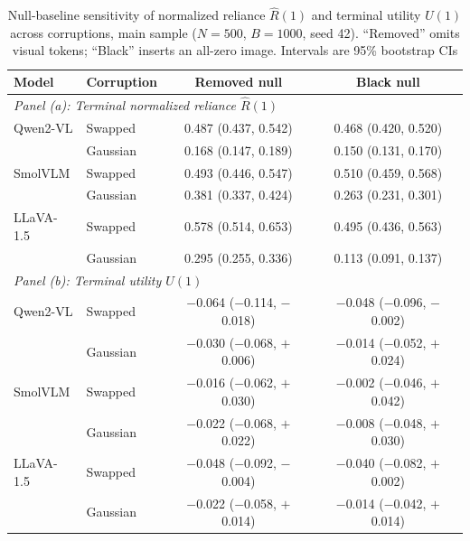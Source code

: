 \begin{table}[tb]
\centering
\caption{Null-baseline sensitivity of normalized reliance $\hat{R}(1)$
  and terminal utility $U(1)$ across corruptions, main sample ($N=500$,
  $B=1000$, seed 42). ``Removed'' omits visual tokens; ``Black'' inserts
  an all-zero image. Intervals are 95\% bootstrap CIs}
\label{tab:nullsens}
{\footnotesize\setlength{\tabcolsep}{3pt}%
\begin{tabular}{llcc}
\toprule
\textbf{Model} & \textbf{Corruption} & \textbf{Removed null} & \textbf{Black null} \\
\midrule
\multicolumn{4}{l}{\textit{Panel (a): Terminal normalized reliance $\hat{R}(1)$}} \\
\midrule
Qwen2-VL  & Swapped  & 0.487 (0.437, 0.542) & 0.468 (0.420, 0.520) \\
          & Gaussian & 0.168 (0.147, 0.189) & 0.150 (0.131, 0.170) \\
SmolVLM   & Swapped  & 0.493 (0.446, 0.547) & 0.510 (0.459, 0.568) \\
          & Gaussian & 0.381 (0.337, 0.424) & 0.263 (0.231, 0.301) \\
LLaVA-1.5 & Swapped  & 0.578 (0.514, 0.653) & 0.495 (0.436, 0.563) \\
           & Gaussian & 0.295 (0.255, 0.336) & 0.113 (0.091, 0.137) \\
\midrule
\multicolumn{4}{l}{\textit{Panel (b): Terminal utility $U(1)$}} \\
\midrule
Qwen2-VL  & Swapped  & $-$0.064 ($-$0.114, $-$0.018) & $-$0.048 ($-$0.096, $-$0.002) \\
          & Gaussian & $-$0.030 ($-$0.068, $+$0.006) & $-$0.014 ($-$0.052, $+$0.024) \\
SmolVLM   & Swapped  & $-$0.016 ($-$0.062, $+$0.030) & $-$0.002 ($-$0.046, $+$0.042) \\
          & Gaussian & $-$0.022 ($-$0.068, $+$0.022) & $-$0.008 ($-$0.048, $+$0.030) \\
LLaVA-1.5 & Swapped  & $-$0.048 ($-$0.092, $-$0.004) & $-$0.040 ($-$0.082, $+$0.002) \\
           & Gaussian & $-$0.022 ($-$0.058, $+$0.014) & $-$0.014 ($-$0.042, $+$0.014) \\
\bottomrule
\end{tabular}}
\end{table}
